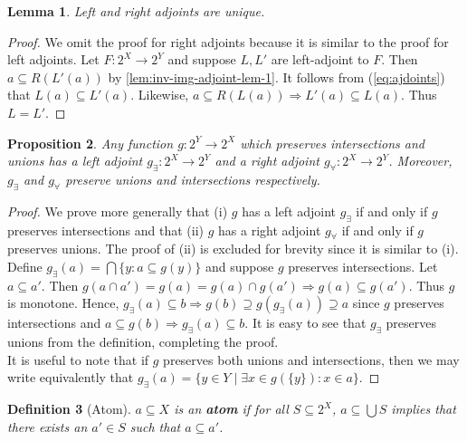 \documentclass{article}
\newtheorem{proposition}{Proposition}[section]
\newtheorem{lemma}[proposition]{Lemma}
\newtheorem{definition}[proposition]{Definition}
\begin{document}
\begin{lemma}\label{lem:inv-img-adjoint-unique}
Left and right adjoints are unique.
\end{lemma}

\begin{proof}
We omit the proof for right adjoints because it is similar to the proof for left adjoints. Let $F : 2^X \to 2^Y$ and suppose $L, L'$ are left-adjoint to $F$. Then $a \subseteq R(L'(a))$ by \cref{lem:inv-img-adjoint-lem-1}. It follows from (\ref{eq:ajdoints}) that $L(a) \subseteq L'(a)$. Likewise, $a \subseteq R(L(a)) \Rightarrow L'(a) \subseteq L(a)$. Thus $L = L'$.
\end{proof}

\begin{proposition}\label{prop:inv-image-has-adjoints}
Any function $g : 2^Y \to 2^X$ which preserves intersections and unions has a left adjoint $g_\exists : 2^X \to 2^Y$ and a right adjoint $g_\forall : 2^X \to 2^Y$. Moreover, $g_\exists$ and $g_\forall$ preserve unions and intersections respectively.
\end{proposition}

\begin{proof}

We prove more generally that (i) $g$ has a left adjoint $g_\exists$ if and only if $g$ preserves intersections and that (ii) $g$ has a right adjoint $g_\forall$ if and only if $g$ preserves unions. The proof of (ii) is excluded for brevity since it is similar to (i). \\

Define $g_\exists(a) = \bigcap \{y : a \subseteq g(y)\}$ and suppose $g$ preserves intersections. Let $a \subseteq a'$. Then $g(a \cap a') = g(a) = g(a) \cap g(a') \Rightarrow g(a) \subseteq g(a')$. Thus $g$ is monotone. Hence, $g_\exists(a) \subseteq b \Rightarrow g(b) \supseteq g(g_\exists(a)) \supseteq a$ since $g$ preserves intersections and $a \subseteq g(b) \Rightarrow g_\exists(a) \subseteq b$. It is easy to see that $g_\exists$ preserves unions from the definition, completing the proof. \\

It is useful to note that if $g$ preserves both unions and intersections, then we may write equivalently that $g_\exists(a) = \{y \in Y \mid \exists x \in g(\{y\}) : x \in a \}$. 
\end{proof}

\begin{definition}[Atom]
$a \subseteq X$ is an \textbf{atom} if for all $S \subseteq 2^X$, $a \subseteq \bigcup S$ implies that there exists an $a' \in S$ such that $a \subseteq a'$.
\end{definition}
\end{document}
